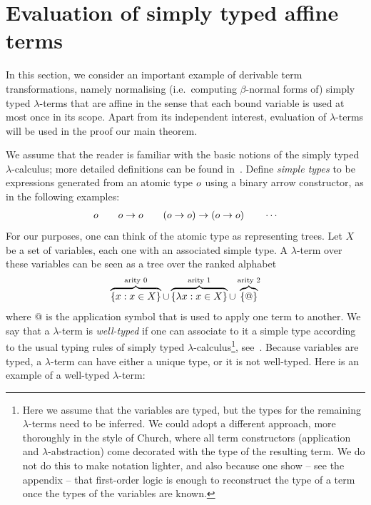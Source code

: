 \section{Evaluation of simply typed affine terms}
\label{sec:one-register}

In this section, we consider an important example of derivable term transformations, namely normalising (i.e.~computing $\beta$-normal forms of)  simply typed  $\lambda$-terms that are affine in the sense that each bound variable is used at most  once in its scope. Apart from its independent interest, evaluation of $\lambda$-terms will  be used in the proof our main theorem. 



We assume that the reader is familiar with the basic notions of the simply typed $\lambda$-calculus; more detailed definitions can be found in~\cite{sorensen_lectures_2006}. 
Define  \emph{simple types} to be expressions  generated from an atomic type $o$ using a binary arrow constructor, as in the following examples:
\begin{align*}
    o \qquad o \to o \qquad (o \to o) \to (o \to o) \qquad \cdots 
\end{align*}
For our purposes, one can think of the atomic type as representing trees.
Let $X$ be a set of variables, each one with an associated simple type.  A $\lambda$-term over these variables can be seen as a tree over the ranked alphabet
\begin{align*}
  \overbrace{\{x : x \in X\}}^{\text{arity 0}} \cup \overbrace{\{\lambda x : x \in X\}}^{\text{arity 1}} \cup  \overbrace{\{@\}}^{\text{arity 2}}
\end{align*}
where @ is the application symbol that is used to apply one term to another.
We say that a $\lambda$-term is \emph{well-typed} if one can associate  to it  a simple type according to the usual typing rules of simply typed $\lambda$-calculus\footnote{
Here we assume that the variables are typed, but the types for the remaining $\lambda$-terms need to be inferred. We could adopt a different approach, more thoroughly in the style of Church, where all term constructors (application and $\lambda$-abstraction) come decorated with the type of the resulting term. We do not do this to make  notation lighter, and also because one show -- see the appendix -- that first-order logic is enough to reconstruct the type of a term once the types of the variables are known. 
}, see~\cite[Definition 3.2.1]{sorensen_lectures_2006}. Because variables are typed, a  $\lambda$-term can have either a unique type, or it is not well-typed.  Here is an example of a well-typed $\lambda$-term: 
